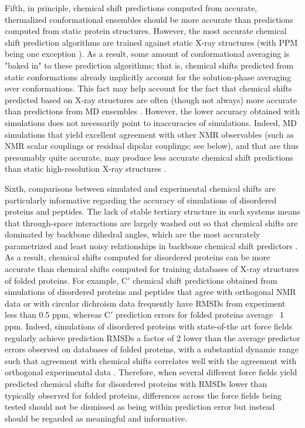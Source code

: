 \documentclass[9pt,review]{livecoms}
\begin{document}
Fifth, in principle, chemical shift predictions computed from accurate, thermalized conformational ensembles should be more accurate than predictions computed from static protein structures.
However, the most accurate chemical shift prediction algorithms are trained against static X-ray structures (with PPM being one exception \cite{li_ppm_2012}).
As a result, some amount of conformational averaging is "baked in" to these prediction algorithms; that is, chemical shifts predicted from static conformations already implicitly account for the solution-phase averaging over conformations.
This fact may help account for the fact that chemical shifts predicted based on X-ray structures are often (though not always) more accurate than predictions from MD ensembles \cite{li_certification_2010,markwick_enhanced_2010,robustelli_interpreting_2012,robustelli_conformational_2013}.
However, the lower accuracy obtained with simulations does not necessarily point to inaccuracies of simulations.
Indeed, MD simulations that yield excellent agreement with other NMR observables (such as NMR scalar couplings or residual dipolar couplings; see below), and that are thus presumably quite accurate, may produce less accurate chemical shift predictions than static high-resolution X-ray structures \cite{li_certification_2010,robustelli_interpreting_2012,robustelli_developing_2018}.

Sixth, comparisons between simulated and experimental chemical shifts are particularly informative regarding the accuracy of simulations of disordered proteins and peptides.
The lack of stable tertiary structure in such systems means that through-space interactions are largely washed out so that chemical shifts are dominated by backbone dihedral angles, which are the most accurately parametrized and least noisy relationships in backbone chemical shift predictors \cite{salmon_nmr_2010}.
As a result, chemical shifts computed for disordered proteins can be more accurate than chemical shifts computed for training databases of X-ray structures of folded proteins.
For example, C$'$ chemical shift predictions obtained from simulations of disordered proteins and peptides that agree with orthogonal NMR data or with circular dichroism data frequently have RMSDs from experiment less than 0.5 ppm, whereas C$'$ prediction errors for folded proteins average ~1 ppm.
Indeed, simulations of disordered proteins with state-of-the art force fields regularly achieve prediction RMSDs a factor of 2 lower than the average predictor errors observed on databases of folded proteins, with a substantial dynamic range such that agreement with chemical shifts correlates well with the agreement with orthogonal experimental data \cite{salmon_nmr_2010,robustelli_conformational_2013,schwalbe_predictive_2014,robustelli_developing_2018}.
Therefore, when several different force fields yield predicted chemical shifts for disordered proteins with RMSDs lower than typically observed for folded proteins, differences across the force fields being tested should not be dismissed as being within prediction error but instead should be regarded as meaningful and informative.
\end{document}
